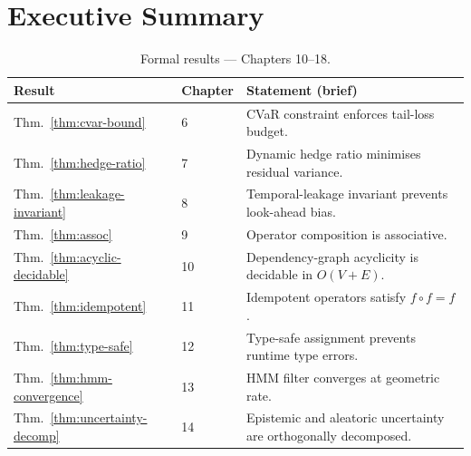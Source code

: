 \documentclass[12pt,openany]{book}
\numberwithin{equation}{chapter}
\theoremstyle{plain}
\theoremstyle{definition}
\theoremstyle{remark}
\newenvironment{executivesummary}{%
  \chapter*{Executive Summary}
}{%
}
\numberwithin{equation}{chapter}
\theoremstyle{plain}
\begin{document}
\begin{executivesummary}
\begin{table}[H]
  \centering
  \caption{Formal results --- Chapters 10--18.}
  \label{tab:exec-thm-B}
  \begin{tabularx}{\linewidth}{@{} l l X @{}}
    \toprule
    \textbf{Result} & \textbf{Chapter} & \textbf{Statement (brief)} \\
    \midrule
    Thm.~\ref{thm:cvar-bound}            & 6  & CVaR constraint enforces tail-loss budget. \\
    Thm.~\ref{thm:hedge-ratio}           & 7  & Dynamic hedge ratio minimises residual variance. \\
    Thm.~\ref{thm:leakage-invariant}     & 8  & Temporal-leakage invariant prevents look-ahead bias. \\
    Thm.~\ref{thm:assoc}                 & 9  & Operator composition is associative. \\
    Thm.~\ref{thm:acyclic-decidable}     & 10 & Dependency-graph acyclicity is decidable in $O(V+E)$. \\
    Thm.~\ref{thm:idempotent}            & 11 & Idempotent operators satisfy $f\circ f = f$. \\
    Thm.~\ref{thm:type-safe}             & 12 & Type-safe assignment prevents runtime type errors. \\
    Thm.~\ref{thm:hmm-convergence}       & 13 & HMM filter converges at geometric rate. \\
    Thm.~\ref{thm:uncertainty-decomp}    & 14 & Epistemic and aleatoric uncertainty are orthogonally decomposed. \\
    \bottomrule
  \end{tabularx}
\end{table}

\end{executivesummary}
\end{document}
